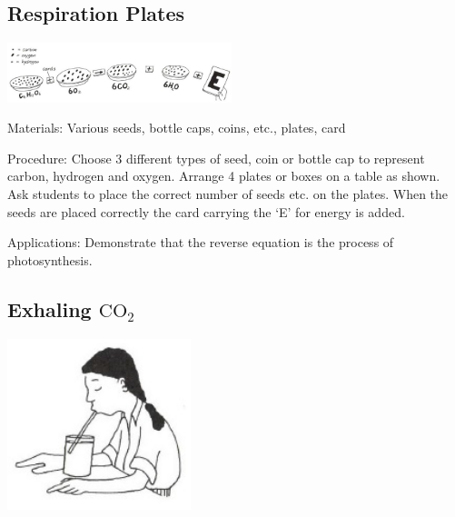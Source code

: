 \begin{multicols}{2}
\subsection{Respiration Plates}

\begin{center}
\includegraphics[width=0.49\textwidth]{./img/vso/respiration-plates.jpg}
\end{center}

\begin{description*}
\item[Materials:]{Various seeds, bottle caps, coins, etc., plates, card}
\item[Procedure:]{Choose 3 different types of seed, coin or bottle cap to represent carbon,
hydrogen and oxygen. Arrange 4 plates or boxes on a table as shown.
Ask students to place the correct number of seeds etc. on the plates.
When the seeds are placed correctly the card carrying the `E' for energy
is added.}
\item[Applications:]{Demonstrate that the reverse equation is the process of
photosynthesis.}
\end{description*}

\subsection{Exhaling $\mathrm{CO_2}$} %

\begin{center}
\includegraphics[width=0.4\textwidth]{./img/vso/exhale-co2.jpg}
\end{center}


\end{multicols}
